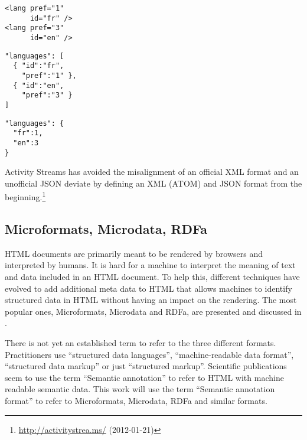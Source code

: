 \documentclass[12pt,a4paper,twoside]{scrartcl}		%
\newcommand{\citeurl}[2]{\url{#1} (#2)}
\begin{document}
\begin{multicols}{3}
\begin{lstlisting}[label=fig:waysmapxmljson,
                  captionpos=t,
                  caption={XML fragment}, frame=single]
<lang pref="1"
      id="fr" />
<lang pref="3"
      id="en" />
\end{lstlisting}
\columnbreak
\begin{lstlisting}[title={unfriendly JSON}, frame=single,
                  captionpos=t
]
"languages": [
  { "id":"fr",
    "pref":"1" },
  { "id":"en",
    "pref":"3" }
]
\end{lstlisting}
\columnbreak
\begin{lstlisting}[title={friendly JSON}, frame=single,
                  captionpos=t
]
"languages": {
  "fr":1,
  "en":3
}
\end{lstlisting}
\end{multicols}

Activity Streams has avoided the misalignment of an official XML format and an unofficial JSON deviate by defining an XML (ATOM) and JSON format from the beginning.\footnote{\citeurl{http://activitystrea.ms/}{2012-01-21}}




\subsection{Microformats, Microdata, RDFa}
\label{sec:microdata}

HTML documents are primarily meant to be rendered by browsers and interpreted by
humans. It is hard for a machine to interpret the meaning of text and data
included in an HTML document. To help this, different techniques have evolved to
add additional meta data to HTML that allows machines to identify structured
data in HTML without having an impact on the rendering. The most popular ones,
Microformats, Microdata and RDFa, are presented and discussed in
\cite{Tennison2012}.

There is not yet an established term to refer to the three different
formats. Practitioners use ``structured data languages''\cite{Sporny2011},
``machine-readable data format''\cite{Hickson2011}, ``structured data
markup''\cite{Goel2011} or just ``structured markup''. Scientific publications
seem to use the term ``Semantic annotation''\cite{instance7} to refer to HTML
with machine readable semantic data. This work will use the term ``Semantic
annotation format'' to refer to Microformats, Microdata, RDFa and similar
formats.
\end{document}

